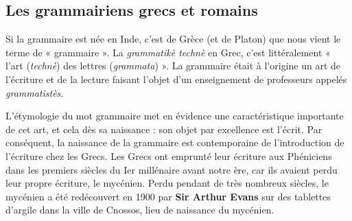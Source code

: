 \subsection{Les grammairiens grecs et romains}
Si la grammaire est née en Inde, c’est de Grèce (et de Platon) que nous vient le terme de « grammaire ». La \textit{grammatikè technè} en Grec, c’est littéralement « l’art (\textit{technè}) des lettres (\textit{grammata}) ». La grammaire était à l’origine un art de l’écriture et de la lecture faisant l’objet d’un enseignement de professeurs appelés \textit{grammatistès}.

L’étymologie du mot grammaire met en évidence une caractéristique importante de cet art, et cela dès sa naissance : son objet par excellence est l’écrit. Par conséquent, la naissance de la grammaire est contemporaine de l’introduction de l’écriture chez les Grecs. Les Grecs ont emprunté leur écriture aux Phéniciens dans les premiers siècles du Ier millénaire avant notre ère, car ils avaient perdu leur propre écriture, le mycénien. Perdu pendant de très nombreux siècles, le mycénien a été redécouvert en 1900 par \textbf{Sir Arthur Evans} sur des tablettes d’argile dans la ville de Cnossos, lieu de naissance du mycénien.
